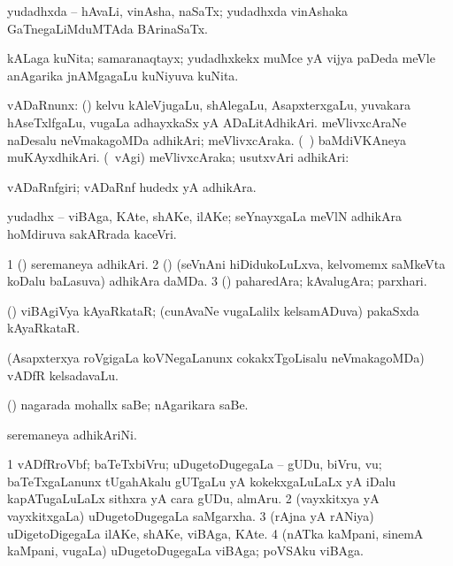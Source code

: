 {\bentry 
{} 
\gl{\nA}
\expl{}
\bmng
yudadhxda -- hAvaLi, vinAsha, naSaTx; yudadhxda vinAshaka GaTnegaLiMduMTAda BArinaSaTx. 
\emng
\eentry

\bentry
{} 
\gl{\nA}
\expl{}
\bmng
kALaga kuNita; samaranaqtayx; yudadhxkekx muMce yA vijya paDeda meVle anAgarika jnAMgagaLu kuNiyuva kuNita. 
\emng
\eentry

\bentry
{} 
\gl{\nA}
\expl{}
\bmng
vADaRnunx: 
\banum
{} (\birx) kelvu kAleVjugaLu, shAlegaLu, AsapxterxgaLu, yuvakara hAseTxlfgaLu, \mo vugaLa adhayxkaSx yA ADaLitAdhikAri. 
 meVlivxcAraNe naDesalu neVmakagoMDa adhikAri; meVlivxcAraka. 
 (\kanmu\ \ame) baMdiVKAneya muKAyxdhikAri. 
 (\sA\ \saupa vAgi) meVlivxcAraka; usutxvAri adhikAri:  
\eanum
\emng
\eentry

\bentry
{} 
\gl{\nA}
\expl{}
\bmng
vADaRnfgiri; vADaRnf hudedx yA adhikAra. 
\emng
\eentry

\bentry
{} 
\gl{\nA}
\expl{}
\bmng
yudadhx -- viBAga, KAte, shAKe, ilAKe; seYnayxgaLa meVlN adhikAra hoMdiruva sakARrada kaceVri. 
\emng
\eentry

\bentry
{} 
\gl{\nA}
\expl{}
\bmng
\bnum
\num{1} (\birx) seremaneya adhikAri. 
\num{2} (\ca) (seVnAni hiDidukoLuLxva, kelvomemx saMkeVta koDalu baLasuva) adhikAra daMDa. 
\num{3} (\pArxparx) paharedAra; kAvalugAra; parxhari. 
\enum
\emng
\eentry

\bentry
{} 
\gl{\nA}
\expl{}
\bmng
(\ame) viBAgiVya kAyaRkataR; (cunAvaNe \mo vugaLalilx kelsamADuva) pakaSxda kAyaRkataR. 
\emng
\eentry

\bentry
{} 
\gl{\nA}
\expl{}
\bmng
(Asapxterxya roVgigaLa koVNegaLanunx cokakxTgoLisalu neVmakagoMDa) vADfR kelsadavaLu. 
\emng
\eentry

\bentry
{} 
\gl{\nA}
\expl{}
\bmng
(\birx) nagarada mohallx saBe; nAgarikara saBe. 
\emng
\eentry

\bentry
{} 
\gl{\nA}
\expl{}
\bmng
seremaneya adhikAriNi. 
\emng
\eentry

\bentry
{} 
\gl{\nA}
\expl{}
\bmng
\bnum
\num{1} vADfRroVbf; baTeTxbiVru; uDugetoDugegaLa -- gUDu, biVru, \mo vu; baTeTxgaLanunx tUgahAkalu gUTgaLu yA kokekxgaLuLaLx yA iDalu kapATugaLuLaLx sithxra yA cara gUDu, almAru. 
\num{2} (vayxkitxya yA vayxkitxgaLa) uDugetoDugegaLa saMgarxha. 
\num{3} (rAjna yA rANiya) uDigetoDigegaLa ilAKe, shAKe, viBAga, KAte. 
\num{4} (nATka kaMpani, sinemA kaMpani, \mo vugaLa) uDugetoDugegaLa viBAga; poVSAku viBAga. 
\enum
\emng
\eentry

}
